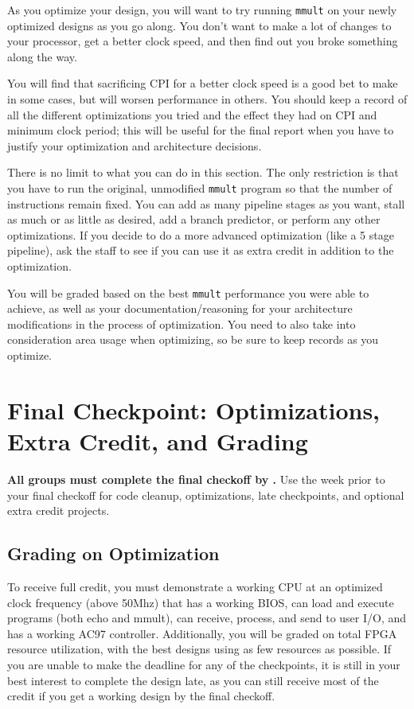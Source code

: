 \documentclass[11pt]{article}
\begin{document}
As you optimize your design, you will want to try running \verb|mmult| on your newly optimized designs as you go along. You don't want to make a lot of changes to your processor, get a better clock speed, and then find out you broke something along the way.

You will find that sacrificing CPI for a better clock speed is a good bet to make in some cases, but will worsen performance in others. You should keep a record of all the different optimizations you tried and the effect they had on CPI and minimum clock period; this will be useful for the final report when you have to justify your optimization and architecture decisions.

There is no limit to what you can do in this section. The only restriction is that you have to run the original, unmodified \verb|mmult| program so that the number of instructions remain fixed. You can add as many pipeline stages as you want, stall as much or as little as desired, add a branch predictor, or perform any other optimizations. If you decide to do a more advanced optimization (like a 5 stage pipeline), ask the staff to see if you can use it as extra credit in addition to the optimization.

You will be graded based on the best \verb|mmult| performance you were able to achieve, as well as your documentation/reasoning for your architecture modifications in the process of optimization. You need to also take into consideration area usage when optimizing, so be sure to keep records as you optimize.

\pagebreak

\section{Final Checkpoint: Optimizations, Extra Credit, and Grading}

\textbf{All groups must complete the final checkoff by \finalCheckoffDueDate.} Use the week prior to your final checkoff for code cleanup, optimizations, late checkpoints, and optional extra credit projects.

\subsection{Grading on Optimization}

To receive full credit, you must demonstrate a working CPU at an optimized clock frequency (above 50Mhz) that has a working BIOS, can load and execute programs (both echo and mmult), can receive, process, and send to user I/O, and has a working AC97 controller. Additionally, you will be graded on total FPGA resource utilization, with the best designs using as few resources as possible. If you are unable to make the deadline for any of the checkpoints, it is still in your best interest to complete the design late, as you can still receive most of the credit if you get a working design by the final checkoff.
\end{document}
